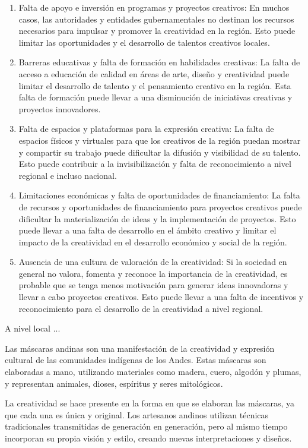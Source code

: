 \documentclass[12pt,a4paper]{article}
\begin{document}
\begin{enumerate}
\item Falta de apoyo e inversión en programas y proyectos creativos: En muchos casos, las autoridades y entidades gubernamentales no destinan los recursos necesarios para impulsar y promover la creatividad en la región. Esto puede limitar las oportunidades y el desarrollo de talentos creativos locales.
\item Barreras educativas y falta de formación en habilidades creativas: La falta de acceso a educación de calidad en áreas de arte, diseño y creatividad puede limitar el desarrollo de talento y el pensamiento creativo en la región. Esta falta de formación puede llevar a una disminución de iniciativas creativas y proyectos innovadores.
\item Falta de espacios y plataformas para la expresión creativa: La falta de espacios físicos y virtuales para que los creativos de la región puedan mostrar y compartir su trabajo puede dificultar la difusión y visibilidad de su talento. Esto puede contribuir a la invisibilización y falta de reconocimiento a nivel regional e incluso nacional.
\item Limitaciones económicas y falta de oportunidades de financiamiento: La falta de recursos y oportunidades de financiamiento para proyectos creativos puede dificultar la materialización de ideas y la implementación de proyectos. Esto puede llevar a una falta de desarrollo en el ámbito creativo y limitar el impacto de la creatividad en el desarrollo económico y social de la región.
\item Ausencia de una cultura de valoración de la creatividad: Si la sociedad en general no valora, fomenta y reconoce la importancia de la creatividad, es probable que se tenga menos motivación para generar ideas innovadoras y llevar a cabo proyectos creativos. Esto puede llevar a una falta de incentivos y reconocimiento para el desarrollo de la creatividad a nivel regional.
\end{enumerate}

A nivel local ...

Las máscaras andinas son una manifestación de la creatividad y expresión cultural de las comunidades indígenas de los Andes. Estas máscaras son elaboradas a mano, utilizando materiales como madera, cuero, algodón y plumas, y representan animales, dioses, espíritus y seres mitológicos.

La creatividad se hace presente en la forma en que se elaboran las máscaras, ya que cada una es única y original. Los artesanos andinos utilizan técnicas tradicionales transmitidas de generación en generación, pero al mismo tiempo incorporan su propia visión y estilo, creando nuevas interpretaciones y diseños.
\end{document}
